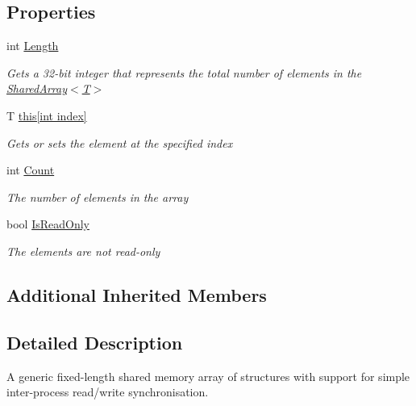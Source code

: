 \subsection*{Properties}
\begin{DoxyCompactItemize}
\item 
int \hyperlink{class_shared_memory_1_1_shared_array_a0fc7647fef708e12caf94e7be58f2c3c}{Length}
\begin{DoxyCompactList}\small\item\em Gets a 32-\/bit integer that represents the total number of elements in the \hyperlink{class_shared_memory_1_1_shared_array_a040ca6a2363a476b8d70ede86470c527}{Shared\+Array$<$\+T$>$} \end{DoxyCompactList}\item 
T \hyperlink{class_shared_memory_1_1_shared_array_a77352ef262de87157ea17f60c0966f8a}{this\mbox{[}int index\mbox{]}}
\begin{DoxyCompactList}\small\item\em Gets or sets the element at the specified index \end{DoxyCompactList}\item 
int \hyperlink{class_shared_memory_1_1_shared_array_a5f1f4e16568b8807a99af211bf8bf2c0}{Count}
\begin{DoxyCompactList}\small\item\em The number of elements in the array \end{DoxyCompactList}\item 
bool \hyperlink{class_shared_memory_1_1_shared_array_a76d12c1779622666451bfd90d35d6a6c}{Is\+Read\+Only}
\begin{DoxyCompactList}\small\item\em The elements are not read-\/only \end{DoxyCompactList}\end{DoxyCompactItemize}
\subsection*{Additional Inherited Members}


\subsection{Detailed Description}
A generic fixed-\/length shared memory array of structures with support for simple inter-\/process read/write synchronisation. 



